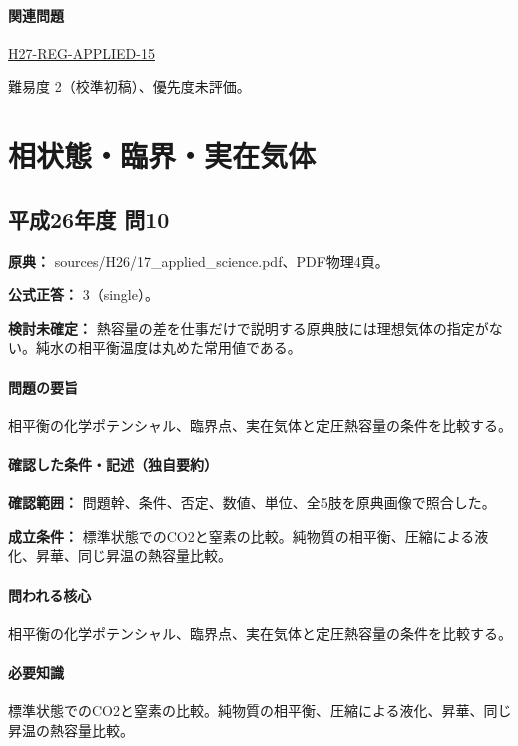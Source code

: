 \paragraph{関連問題} \hyperref[q:h27-reg-applied-15]{H27-REG-APPLIED-15}

\par 難易度 2（校準初稿）、優先度未評価。

\section{相状態・臨界・実在気体}

\subsection{平成26年度 問10}
\label{q:h26-reg-applied-10}

\noindent\textbf{原典：} sources/H26/17\_applied\_science.pdf、PDF物理4頁。

\textbf{公式正答：} 3（single）。

\par\textbf{検討未確定：} 熱容量の差を仕事だけで説明する原典肢には理想気体の指定がない。純水の相平衡温度は丸めた常用値である。

\paragraph{問題の要旨} 相平衡の化学ポテンシャル、臨界点、実在気体と定圧熱容量の条件を比較する。

\paragraph{確認した条件・記述（独自要約）}\mbox{}\par

\noindent\textbf{確認範囲：} 問題幹、条件、否定、数値、単位、全5肢を原典画像で照合した。\par

\noindent\textbf{成立条件：} 標準状態でのCO2と窒素の比較。純物質の相平衡、圧縮による液化、昇華、同じ昇温の熱容量比較。\par

\paragraph{問われる核心} 相平衡の化学ポテンシャル、臨界点、実在気体と定圧熱容量の条件を比較する。

\paragraph{必要知識} 標準状態でのCO2と窒素の比較。純物質の相平衡、圧縮による液化、昇華、同じ昇温の熱容量比較。

